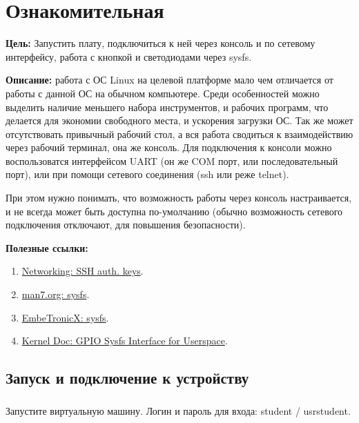 \chapter{Ознакомительная}
\textbf{Цель:} Запустить плату, подключиться к ней через консоль и по сетевому интерфейсу, работа с кнопкой и светодиодами через sysfs.

\vspace{5mm}
\textbf{Описание:} работа с ОС Linux на целевой платформе мало чем отличается от работы с данной ОС на обычном компьютере. Среди особенностей можно выделить наличие меньшего набора инструментов, и рабочих программ, что делается для экономии свободного места, и ускорения загрузки ОС. Так же может отсутствовать привычный рабочий стол, а вся работа сводиться к взаимодействию через рабочий терминал, она же консоль. Для подключения к консоли можно воспользоватся интерфейсом UART (он же COM порт, или последовательный порт), или при помощи сетевого соединения (ssh или реже telnet). 

При этом нужно понимать, что возможность работы через консоль настраивается, и не всегда может быть доступна по-умолчанию (обычно возможность сетевого подключения отключают, для повышения безопасности). 

\vspace{5mm}
\textbf{Полезные ссылки:}
\begin{enumerate}
	\item \href{https://docstore.mik.ua/orelly/networking_2ndEd/ssh/ch02_04.htm#ch02-99646.html}{Networking: SSH auth. keys}.
	\item \href{https://man7.org/linux/man-pages/man5/sysfs.5.html}{man7.org: sysfs}.
	\item \href{https://embetronicx.com/tutorials/linux/device-drivers/sysfs-in-linux-kernel/}{EmbeTronicX: sysfs}.
	\item \href{https://www.kernel.org/doc/Documentation/gpio/sysfs.txt}{Kernel Doc: GPIO Sysfs Interface for Userspace}.	
\end{enumerate}

\section{Запуск и подключение к устройству}

\subsection{}Запустите виртуальную машину. Логин и пароль для входа: student / usrstudent.


